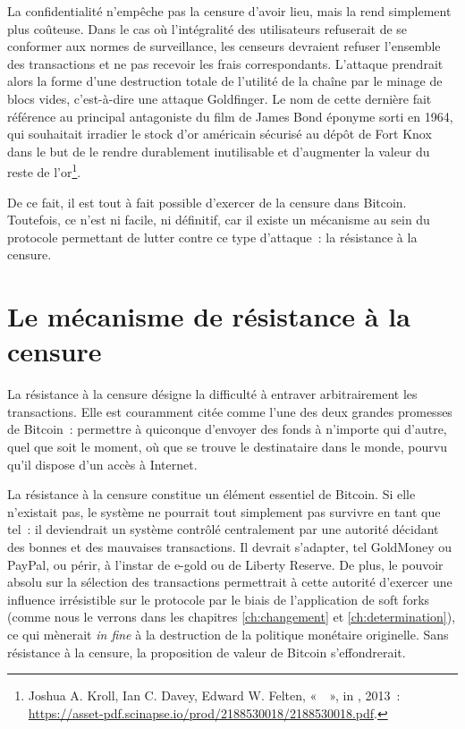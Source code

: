 La confidentialité n'empêche pas la censure d'avoir lieu, mais la rend simplement plus coûteuse. Dans le cas où l'intégralité des utilisateurs refuserait de se conformer aux normes de surveillance, les censeurs devraient refuser l'ensemble des transactions et ne pas recevoir les frais correspondants. L'attaque prendrait alors la forme d'une destruction totale de l'utilité de la chaîne par le minage de blocs vides, c'est-à-dire une attaque Goldfinger. Le nom de cette dernière fait référence au principal antagoniste du film de James Bond éponyme sorti en 1964, qui souhaitait irradier le stock d'or américain sécurisé au dépôt de Fort Knox dans le but de le rendre durablement inutilisable et d'augmenter la valeur du reste de l'or\footnote{Joshua A. Kroll, Ian C. Davey, Edward W. Felten, «~~», in , 2013~: \url{https://asset-pdf.scinapse.io/prod/2188530018/2188530018.pdf}.}.

\clearpage
De ce fait, il est tout à fait possible d'exercer de la censure dans Bitcoin. Toutefois, ce n'est ni facile, ni définitif, car il existe un mécanisme au sein du protocole permettant de lutter contre ce type d'attaque~: la résistance à la censure.

\section*{Le mécanisme de résistance à la censure}

La résistance à la censure désigne la difficulté à entraver arbitrairement les transactions. Elle est couramment citée comme l'une des deux grandes promesses de Bitcoin~: permettre à quiconque d'envoyer des fonds à n'importe qui d'autre, quel que soit le moment, où que se trouve le destinataire dans le monde, pourvu qu'il dispose d'un accès à Internet.

La résistance à la censure constitue un élément essentiel de Bitcoin. Si elle n'existait pas, le système ne pourrait tout simplement pas survivre en tant que tel~: il deviendrait un système contrôlé centralement par une autorité décidant des bonnes et des mauvaises transactions. Il devrait s'adapter, tel GoldMoney ou PayPal, ou périr, à l'instar de e-gold ou de Liberty Reserve. De plus, le pouvoir absolu sur la sélection des transactions permettrait à cette autorité d'exercer  une influence irrésistible sur le protocole par le biais de l'application de soft forks (comme nous le verrons dans les chapitres \ref{ch:changement} et \ref{ch:determination}), ce qui mènerait \emph{in fine} à la destruction de la politique monétaire originelle. Sans résistance à la censure, la proposition de valeur de Bitcoin s'effondrerait.

